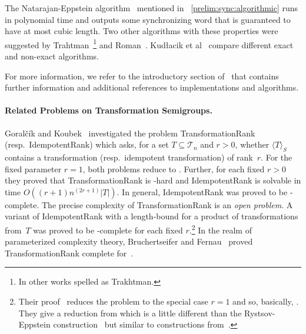 The Natarajan-Eppstein algorithm~\cite{Eppstein90,DBLP:conf/focs/Natarajan86} mentioned in \SEC~\ref{prelim:sync:algorithmic}
runs in polynomial time and 
outputs some synchronizing word
that is guaranteed to have at most cubic length.
Two other algorithms with these properties
were suggested by Trahtman~\cite{Trahtman04}\footnote{In other works spelled as Trakhtman.}
and Roman~\cite{DBLP:journals/amc/Roman09}.
Kud\l acik et al~\cite{KUDLACIK201211746}
compare different exact and non-exact algorithms.

For more information, we refer to the introductory section of~\cite{KisKowSzy2015}
that contains further information and additional references
to implementations and algorithms.

\paragraph{Related Problems on Transformation Semigroups.} 
Goral\v{c}\'{i}k and Koubek~\cite{GorKou95}
investigated the problem {\sc TransformationRank} (resp.~{\sc IdempotentRank}) 
which asks, for a set $T \subseteq \mathcal T_n$ and $r > 0$,
whether $\langle T \rangle_S$ contains a transformation (resp.~idempotent transformation)
of rank~$r$. For the fixed parameter $r = 1$, both problems
reduce to \DFAS.
Further, for each fixed $r > 0$ they proved that {\sc TransformationRank} is \NP-hard
and {\sc IdempotentRank} is solvable in time $O((r+1)n^{(2r+1)}|T|)$.
In general, {\sc IdempotentRank} was proved to be \PSPACE-complete.
The precise complexity of {\sc TransformationRank} is an \emph{open problem}.
A variant of {\sc IdempotentRank} with a 
length-bound for a product of transformations from~$T$
was proved to be \NP-complete for each fixed $r$.\footnote{Their proof~\cite[Thm.~5]{GorKou95} reduces 
	the problem to the special case $r = 1$
	and so, basically, \DFASWS. 
	They give a reduction from \THREESAT
	which is a little different than
	the Rystsov-Eppstein construction~\cite{Eppstein90,Rys80} 
	but similar to constructions
	from~\cite{DBLP:conf/fun/FernauH022,DBLP:journals/jcss/FernauHV15,FernauHoffmann19,Mar2009b}.}
In the realm of parameterized complexity theory,
Bruchertseifer and Fernau~\cite[Thm.~8]{DBLP:journals/mscs/FernauB22}
proved {\sc TransformationRank} complete for~\WSYNC.


